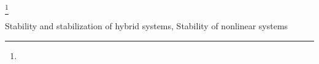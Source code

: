\documentclass[final]{ifacconf}
\begin{document}
	\begin{frontmatter}

		\makeatletter
		\title{\pwintz@title{}} 
		
		\thanks[footnoteinfo]{\acknowledgementBlurb}
		
		\author[First]{\csname pwintz@author1\endcsname}\quad
		\author[Second]{\csname pwintz@author2\endcsname} 
		
		\address[First]{\csname pwintz@longAffiliation1\endcsname{} \textup{()}}
		\address[Second]{\csname pwintz@longAffiliation2\endcsname{} \textup{()}}
		
		\begin{abstract}
			
		\end{abstract}
		\makeatother
		
		\begin{keyword}
			Stability and stabilization of hybrid systems, Stability of nonlinear systems
		\end{keyword}
	
	\end{frontmatter}

	
\end{document}
